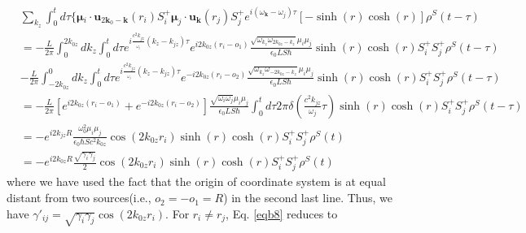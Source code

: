 \documentclass[aps,showpacs,onecolumn,twoside,groupedaddress]{revtex4}
\let\vec\bm
\begin{document}
\begin{equation}
\label{eqb9}\tag{A8}
\begin{split}
&\underset{k_{z}}{\sum}\int_{0}^{t}d\tau\{\vec{\mu}{}_{i}\cdot\vec{u}_{2\vec{k}_{0}-\vec{k}}(r_{i})S_{i}^{+}\vec{\mu}_{j}\cdot\vec{u}_{\vec{k}}(r_{j})S_{j}^{+}e^{i(\omega_{\vec{k}}-\omega_{j})\tau}[-\sinh(r)\cosh(r)]\rho^{S}(t-\tau)\\
&=-\frac{L}{2\pi}\int_{0}^{2k_{0z}}dk_{z}\int_{0}^{t}d\tau e^{i\frac{c^{2}k_{jz}}{_{\omega_{j}}}(k_{z}-k_{jz})\tau}e^{i2k_{0z}(r_{i}-o_{1})}\frac{\sqrt{\omega_{k_{z}}\omega_{2k_{0z}-k_{z}}}\mu_{i}\mu_{j}}{\epsilon_{0}LS\hbar}\sinh(r)\cosh(r)S_{i}^{+}S_{j}^{+}\rho^{S}(t-\tau)\\
&-\frac{L}{2\pi}\int_{-2k_{0z}}^{0}dk_{z}\int_{0}^{t}d\tau e^{i\frac{c^{2}k_{jz}}{_{\omega_{j}}}(k_{z}-k_{jz})\tau}e^{-i2k_{0z}(r_{i}-o_{2})}\frac{\sqrt{\omega_{k_{z}}\omega_{-2k_{0z}-k_{z}}}\mu_{i}\mu_{j}}{\epsilon_{0}LS\hbar}\sinh(r)\cosh(r)S_{i}^{+}S_{j}^{+}\rho^{S}(t-\tau)\\
&=-\frac{L}{2\pi}[e^{i2k_{0z}(r_{i}-o_{1})}+e^{-i2k_{0z}(r_{i}-o_{2})}]\frac{\sqrt{\omega_{i}\omega_{j}}\mu_{i}\mu_{j}}{\epsilon_{0}LS\hbar}\int_{0}^{t}d\tau2\pi\delta(\frac{c^{2}k_{jz}}{\omega_{j}}\tau)\sinh(r)\cosh(r)S_{i}^{+}S_{j}^{+}\rho^{S}(t-\tau)\\
&=-e^{i2k_{jz}R}\frac{\omega_{0}^{2}\mu_{i}\mu_{j}}{\epsilon_{0}\hbar Sc^{2}k_{0z}}\cos(2k_{0z}r_{i})\sinh(r)\cosh(r)S_{i}^{+}S_{j}^{+}\rho^{S}(t)\\
&=-e^{i2k_{0z}R}\frac{\sqrt{\gamma_{i}\gamma_{j}}}{2}\cos(2k_{0z}r_{i})\sinh(r)\cosh(r)S_{i}^{+}S_{j}^{+}\rho^{S}(t)
\end{split}
\end{equation}
where we have used the fact that the origin of coordinate system is at equal distant from two sources(i.e., $o_2=-o_1=R$) in the second last line. Thus, we have $\gamma'_{ij}=\sqrt{\gamma_{i}\gamma_{j}}\cos(2k_{0z}r_{i})$. For $r_i\neq r_j$, Eq. \eqref{eqb8} reduces to
\end{document}
